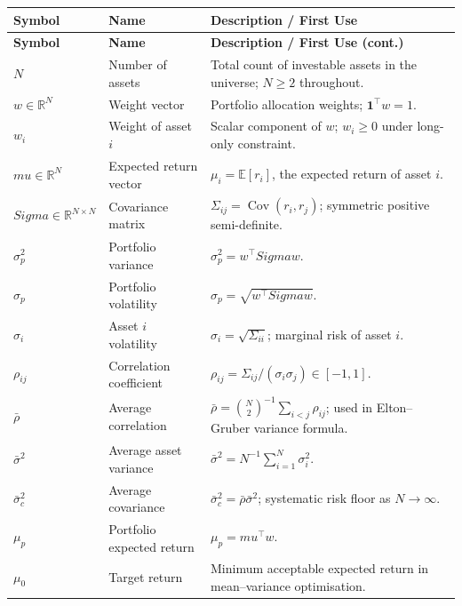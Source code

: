 \documentclass[12pt,openany]{book}
\newcommand{\R}{\mathbb{R}}
\newcommand{\E}{\mathbb{E}}
\newcommand{\bfw}{\mathbf{w}}
\newcommand{\bfmu}{\boldsymbol{\mu}}
\newcommand{\bfSigma}{\boldsymbol{\Sigma}}
\newcommand{\bfone}{\mathbf{1}}
\DeclareMathOperator{\Cov}{Cov}
\numberwithin{equation}{chapter}
\theoremstyle{plain}
\theoremstyle{definition}
\theoremstyle{remark}
\def\bfw{w}%
\def\bfmu{mu}%
\def\bfSigma{Sigma}%
\begin{document}
{\small
\begin{longtable}{@{} p{3.2cm} p{3.8cm} p{\dimexpr\textwidth-3.2cm-3.8cm-4\tabcolsep\relax} @{}}
\hline
\textbf{Symbol} & \textbf{Name} & \textbf{Description / First Use} \\
\hline
\endfirsthead
\hline
\textbf{Symbol} & \textbf{Name} & \textbf{Description / First Use (cont.)} \\
\hline
\endhead
\endfoot
$N$ & Number of assets &
  Total count of investable assets in the universe; $N \ge 2$
  throughout. \\
\addlinespace
$\bfw \in \R^N$ & Weight vector &
  Portfolio allocation weights; $\bfone^\top\bfw = 1$. \\
\addlinespace
$w_i$ & Weight of asset $i$ &
  Scalar component of $\bfw$; $w_i \ge 0$ under long-only constraint. \\
\addlinespace
$\bfmu \in \R^N$ & Expected return vector &
  $\mu_i = \E[r_i]$, the expected return of asset $i$. \\
\addlinespace
$\bfSigma \in \R^{N\times N}$ & Covariance matrix &
  $\Sigma_{ij} = \Cov(r_i,r_j)$; symmetric positive semi-definite. \\
\addlinespace
$\sigma_p^2$ & Portfolio variance &
  $\sigma_p^2 = \bfw^\top\bfSigma\bfw$. \\
\addlinespace
$\sigma_p$ & Portfolio volatility &
  $\sigma_p = \sqrt{\bfw^\top\bfSigma\bfw}$. \\
\addlinespace
$\sigma_i$ & Asset $i$ volatility &
  $\sigma_i = \sqrt{\Sigma_{ii}}$; marginal risk of asset $i$. \\
\addlinespace
$\rho_{ij}$ & Correlation coefficient &
  $\rho_{ij} = \Sigma_{ij}/(\sigma_i\sigma_j) \in [-1,1]$. \\
\addlinespace
$\bar{\rho}$ & Average correlation &
  $\bar{\rho} = \binom{N}{2}^{-1}\sum_{i<j}\rho_{ij}$; used in
  Elton--Gruber variance formula. \\
\addlinespace
$\bar{\sigma}^2$ & Average asset variance &
  $\bar{\sigma}^2 = N^{-1}\sum_{i=1}^N\sigma_i^2$. \\
\addlinespace
$\bar{\sigma}_c^2$ & Average covariance &
  $\bar{\sigma}_c^2 = \bar{\rho}\bar{\sigma}^2$; systematic risk
  floor as $N\to\infty$. \\
\addlinespace
$\mu_p$ & Portfolio expected return &
  $\mu_p = \bfmu^\top\bfw$. \\
\addlinespace
$\mu_0$ & Target return &
  Minimum acceptable expected return in mean--variance optimisation. \\

\end{longtable}}
\end{document}
